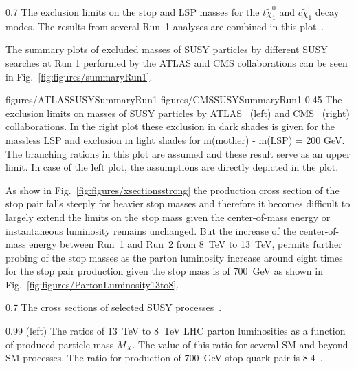                  {0.7}       %
                { The exclusion limits on the stop and LSP masses for the $t \tilde{\chi}_{1}^0$ and $c \tilde{\chi}_{1}^0$ decay modes. The results from several Run~1 analyses are combined in this plot~\cite{website:SUSYresRunI}.   } %

The summary plots of excluded masses of SUSY particles by different SUSY searches at Run 1 performed by the ATLAS and CMS collaborations can be seen in Fig.~\ref{fig:figures/summaryRun1}.


                 {figures/ATLASSUSYSummaryRun1}
                 {figures/CMSSUSYSummaryRun1} %
                 {0.45}       %
                 {The exclusion limits on masses of SUSY particles by ATLAS~\cite{website:SUSYresRunIATLAS} (left) and CMS~\cite{website:SUSYresRunI} (right) collaborations. In the right plot these exclusion in dark shades is given for the massless LSP and exclusion in light shades for m(mother) - m(LSP) = 200 GeV. The branching rations in this plot are assumed and these result serve as an upper limit. In case of the left plot, the assumptions are directly depicted in the plot.}

As show in Fig.~\ref{fig:figures/xsectionsstrong} the production cross section of the stop pair falls steeply for heavier stop masses and therefore it becomes difficult to largely extend the limits on the stop mass given the center-of-mass energy or instantaneous luminosity remains unchanged. But the increase of the center-of-mass energy between Run~1 and Run~2 from 8~TeV to 13~TeV, permits further probing of the stop masses as the parton luminosity increase around eight times for the stop pair production given the stop mass is of 700~GeV as shown in Fig.~\ref{fig:figures/PartonLuminosity13to8}.  

                 {0.7}       %
                 { The cross sections of selected SUSY processes~\cite{website:LHCxsec}. }

                 {0.99}       %
                 {(left) The ratios of 13~TeV to 8~TeV LHC parton luminosities as a function of produced particle mass $M_{X}$. The value of this ratio for several SM and beyond SM processes.  The ratio for production of 700~GeV stop quark pair is 8.4~\cite{Hoecker:2236645}.}
\newpage
